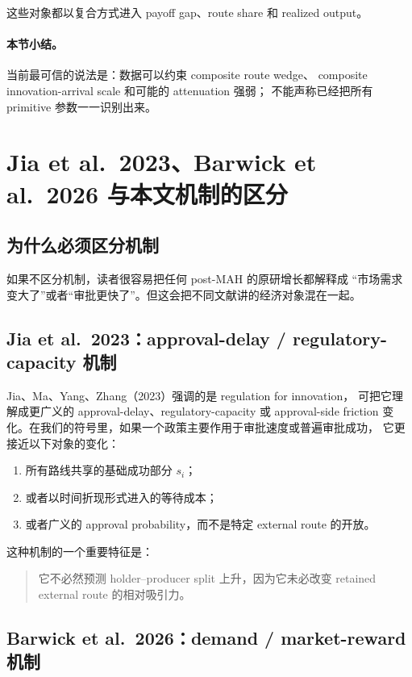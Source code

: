 \documentclass[12pt,UTF8]{ctexart}
\theoremstyle{plain}
\theoremstyle{remark}
\begin{document}
这些对象都以复合方式进入 payoff gap、route share 和 realized output。

\paragraph{本节小结。}
当前最可信的说法是：数据可以约束 composite route wedge、
composite innovation-arrival scale 和可能的 attenuation 强弱；
不能声称已经把所有 primitive 参数一一识别出来。

\section{Jia et al.\ 2023、Barwick et al.\ 2026 与本文机制的区分}

\subsection{为什么必须区分机制}

如果不区分机制，读者很容易把任何 post-MAH 的原研增长都解释成
“市场需求变大了”或者“审批更快了”。但这会把不同文献讲的经济对象混在一起。

\subsection{Jia et al.\ 2023：approval-delay / regulatory-capacity 机制}

Jia、Ma、Yang、Zhang（2023）强调的是 regulation for innovation，
可把它理解成更广义的 approval-delay、regulatory-capacity 或 approval-side
friction 变化。在我们的符号里，如果一个政策主要作用于审批速度或普遍审批成功，
它更接近以下对象的变化：

\begin{enumerate}[leftmargin=2em]
    \item 所有路线共享的基础成功部分 $s_i$；
    \item 或者以时间折现形式进入的等待成本；
    \item 或者广义的 approval probability，而不是特定 external route 的开放。
\end{enumerate}

这种机制的一个重要特征是：

\begin{quote}
它不必然预测 holder--producer split 上升，因为它未必改变 retained
external route 的相对吸引力。
\end{quote}

\subsection{Barwick et al.\ 2026：demand / market-reward 机制}
\end{document}

